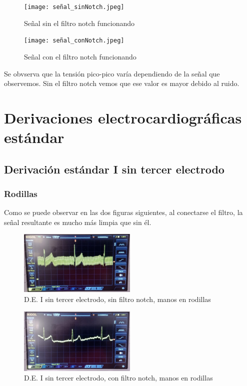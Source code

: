 \documentclass[conference]{IEEEtran}
\begin{document}
\begin{figure}[htbp]
    \centerline{\texttt{[image: señal\_sinNotch.jpeg]}}
    \caption{Señal sin el filtro notch funcionando}
    \label{s_sinNotch}
    \end{figure}

\begin{figure}[htbp]
    \centerline{\texttt{[image: señal\_conNotch.jpeg]}}
    \caption{Señal con el filtro notch funcionando}
    \label{s_conNotch}
    \end{figure}

Se obvserva que la tensión pico-pico varía dependiendo de la señal que observemos. Sin el filtro notch vemos que ese valor es mayor debido al ruido.

\section{Derivaciones electrocardiográficas estándar}
\subsection{Derivación estándar I sin tercer electrodo}
\subsubsection{Rodillas}
Como se puede observar en las dos figuras siguientes, al conectarse el filtro, la señal resultante es mucho más limpia que sin él.
\begin{figure}[H]
    \centerline{\includegraphics[width=0.5\textwidth]{d_SINelectrodo_SINnotch.jpg}}
    \caption{D.E. I sin tercer electrodo, sin filtro notch, manos en rodillas}
    \end{figure}
\begin{figure}[H]
    \centerline{\includegraphics[width=0.5\textwidth]{d_SINelectrodo_CONnotch.jpg}}
    \caption{D.E. I sin tercer electrodo, con filtro notch, manos en rodillas}
    \end{figure}
\end{document}

